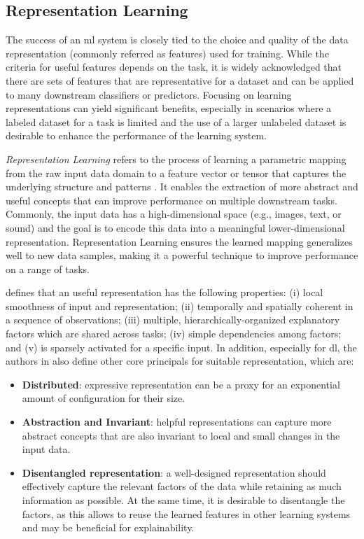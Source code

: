 \subsection{Representation Learning}

The success of an \acs{ml} system is closely tied to the choice and quality of the data representation (commonly referred as features) used for training. While the criteria for useful features depends on the task, it is widely acknowledged that there are sets of features that are representative for a dataset and can be applied to many downstream classifiers or predictors. Focusing on learning representations can yield significant benefits, especially in scenarios where a labeled dataset for a task is limited and the use of a larger unlabeled dataset is desirable to enhance the performance of the learning system.

\textit{Representation Learning} refers to the process of learning a parametric mapping from the raw input data domain to a feature vector or tensor that captures the underlying structure and patterns \citep{le2020contrastive}. It enables the extraction of more abstract and useful concepts that can improve performance on multiple downstream tasks. Commonly, the input data has a high-dimensional space (e.g., images, text, or sound) and the goal is to encode this data into a meaningful lower-dimensional representation. Representation Learning ensures the learned mapping generalizes well to new data samples, making it a powerful technique to improve performance on a range of tasks.

\cite{bengio2013representation} defines that an useful representation has the following properties: (i) local smoothness of input and representation; (ii) temporally and spatially coherent in a sequence of observations; (iii) multiple, hierarchically-organized explanatory factors which are shared across tasks; (iv) simple dependencies among factors; and (v) is sparsely activated for a specific input. In addition, especially for \acl{dl}, the authors in \citep{le2020contrastive} also define other core principals for suitable representation, which are:

\begin{itemize}
\item \textbf{Distributed}: expressive representation can be a proxy for an exponential amount of configuration for their size.

\item \textbf{Abstraction and Invariant}: helpful representations can capture more abstract concepts that are also invariant to local and small changes in the input data.

\item \textbf{Disentangled representation}: a well-designed representation should effectively capture the relevant factors of the data while retaining as much information as possible. At the same time, it is desirable to disentangle the factors, as this allows to reuse the learned features in other learning systems and may be beneficial for explainability. 
\end{itemize}

